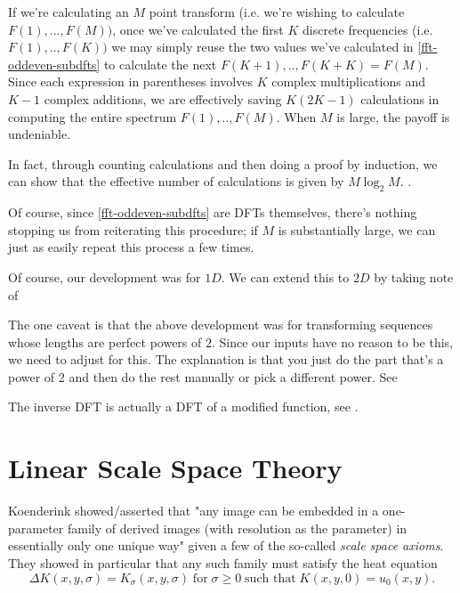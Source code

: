 If we're calculating an $M$ point transform  (i.e. we're wishing to
calculate $F(1), ... , F(M))$, once we've calculated the first $K$ discrete frequencies (i.e. $F(1), .. , F(K))$ we may simply reuse the two values we've calculated in \cref{fft-oddeven-subdfts} to calculate the next $F(K+1),..,F(K+K) = F(M)$. Since each expression in parentheses involves $K$ complex multiplications and $K-1$ complex additions, we are effectively saving $K(2K-1)$ calculations in computing the entire spectrum  $F(1), ..,  F(M)$. When $M$ is large, the payoff is undeniable.

In fact, through counting calculations and then doing a proof by induction, we can show that the effective number of calculations is given by $M\log_2{M}$. .

Of course, since \cref{fft-oddeven-subdfts} are DFTs themselves, there's nothing stopping us from reiterating this procedure; if $M$ is substantially large, we can just as easily repeat this process a few times.

Of course, our development was for $1D$.  We can extend this to $2D$ by taking note of 

The one caveat is that the above development was for transforming sequences whose lengths are perfect powers of $2$. Since our inputs have no reason to be this, we need to adjust for this. The explanation is  that you just do the part that's a power of 2 and  then do the rest manually or pick a different power. See 


The inverse DFT is actually a DFT of a modified function, see . 

\hrulefill
\section{Linear Scale Space Theory} \label{sec:scale-space-theory}

Koenderink showed/asserted that "any image can be embedded in a one-parameter family of derived images (with resolution as the parameter) in essentially only one unique way" given a few of the so-called \textit{scale space axioms}. They showed in particular that any such family must satisfy the heat equation
\begin{equation}
	\Delta K(x,y,\sigma) = K_\sigma (x,y,\sigma) 
	\;\text{for}\; \sigma \ge 0
	\;\text{such that}\; K(x,y, 0) = u_0(x,y).
	\end{equation}
	
